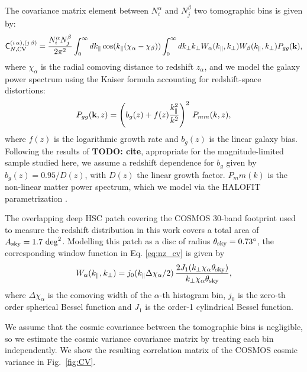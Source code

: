 \documentclass[a4paper,11pt]{article}
\newcommand{\todo}[1]{{\bf TODO: #1}}
\begin{document}
        The covariance matrix element between $N^\alpha_i$ and $N^\beta_j$ two tomographic bins is given by:
        \begin{equation}\label{eq:nz_cv}
          {\sf C}_{N,{\rm CV}}^{(i\,\alpha),(j\,\beta)}=\frac{N^\alpha_iN^\beta_j}{2\pi^2} \int_0^\infty dk_\parallel \cos(k_\parallel(\chi_\alpha-\chi_\beta))\int_0^\infty dk_\perp k_\perp W_\alpha(k_\parallel,k_\perp)W_\beta(k_\parallel,k_\perp)P_{gg}({\bf k}),
        \end{equation}
        where $\chi_\alpha$ is the radial comoving distance to redshift $z_\alpha$, and we model the galaxy power spectrum using the Kaiser formula \cite{1987MNRAS.227....1K} accounting for redshift-space distortions:
        \begin{equation}
          P_{gg}({\bf k},z)=\left(b_g(z)+f(z)\frac{k_\parallel^2}{k^2}\right)^2\,P_{mm}(k,z),
        \end{equation}
        where $f(z)$ is the logarithmic growth rate and $b_g(z)$ is the linear galaxy bias. Following the results of \todo{cite}, appropriate for the magnitude-limited sample studied here, we assume a redshift dependence for $b_g$ given by $b_g(z) = 0.95/D(z)$, with $D(z)$ the linear growth factor. $P_mm(k)$ is the non-linear matter power spectrum, which we model via the HALOFIT parametrization \cite{2003MNRAS.341.1311S}.

        The overlapping deep HSC patch covering the COSMOS 30-band footprint used to measure the redshift distribution in this work covers a total area of $A_{\rm sky} = 1.7 \ {\rm deg}^2$. Modelling this patch as a disc of radius $\theta_{\rm sky}=0.73^\circ$, the corresponding window function in Eq. \ref{eq:nz_cv} is given by
        \begin{equation}
          W_\alpha(k_\parallel,k_\perp)=j_0(k_\parallel\Delta\chi_\alpha/2)\,\frac{2 J_1(k_\perp \chi_\alpha\theta_{\rm sky})}{k_\perp \chi_\alpha\theta_{\rm sky}},
        \end{equation}
        where $\Delta\chi_\alpha$ is the comoving width of the $\alpha$-th histogram bin, $j_0$ is the zero-th order spherical Bessel function and $J_1$ is the order-1 cylindrical Bessel function.

        We assume that the cosmic covariance between the tomographic bins is negligible, so we estimate the cosmic variance covariance matrix by treating each bin independently. We show the resulting correlation matrix of the COSMOS cosmic variance in Fig.~\ref{fig:CV}.
        
\end{document}
